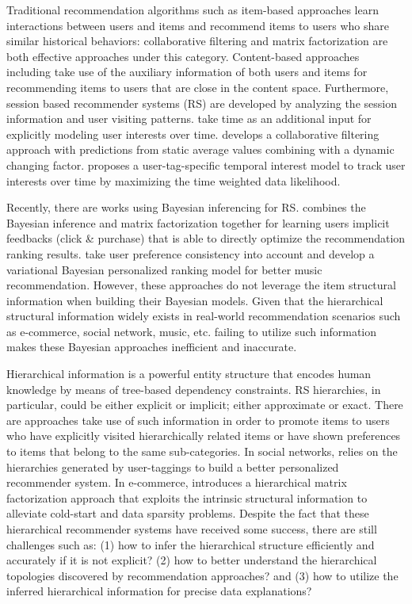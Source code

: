 Traditional recommendation algorithms such as item-based approaches learn interactions between users and items and recommend items to users who share similar historical behaviors: collaborative filtering \cite{Sarwar:2001:ICF:371920.372071,Su:2009:SCF:1592474.1722966} and matrix factorization \cite{Rendle:2010:FPM} are both effective approaches under this category.  Content-based approaches including \cite{2011rsh..book...73L,Liu:2011,Yuan:2015} take use of the auxiliary information of both users and items for recommending items to users that are close in the content space.  Furthermore, session based recommender systems (RS) are developed by analyzing the session information and user visiting patterns.   \cite{Gultekin_acollaborative,Tang_review:2013} take time as an additional input for explicitly modeling user interests over time.  \cite{Koren:2010} develops a collaborative filtering approach with predictions from static average values combining with a dynamic changing factor. \cite{Yin:2011} proposes a user-tag-specific temporal interest model to track user interests over time by maximizing the time weighted data likelihood.  

Recently, there are works using Bayesian inferencing for RS.  \cite{rendle2009bpr} combines the Bayesian inference and matrix factorization together for learning users implicit feedbacks (click \& purchase) that is able to directly optimize the recommendation ranking results.   \cite{Ben-Elazar:2017,zhang2007efficient} take user preference consistency into account and develop a variational Bayesian personalized ranking model for better music recommendation.  However, these approaches do not leverage the item structural information when building their Bayesian models.  Given that the hierarchical structural information widely exists in real-world recommendation scenarios such as e-commerce, social network, music, etc. failing to utilize such information makes these Bayesian approaches inefficient and inaccurate.  

Hierarchical information is a powerful entity structure that encodes human knowledge by means of tree-based dependency constraints. RS hierarchies, in particular, could be either explicit or implicit; either approximate or exact.  There are approaches take use of such information in order to promote items to users who have explicitly visited hierarchically related items or have shown preferences to items that belong to the same sub-categories.  In social networks, \cite{shepitsen2008personalized} relies on the hierarchies generated by user-taggings to build a better personalized recommender system.  In e-commerce, \cite{wang2018exploring} introduces a hierarchical matrix factorization approach that exploits the intrinsic structural information to alleviate cold-start and data sparsity problems.  Despite the fact that these hierarchical recommender systems have received some success, there are still challenges such as: (1) how to infer the hierarchical structure efficiently and accurately if it is not explicit? (2) how to better understand the hierarchical topologies discovered by recommendation approaches? and (3) how to utilize the inferred hierarchical information for precise data explanations?

